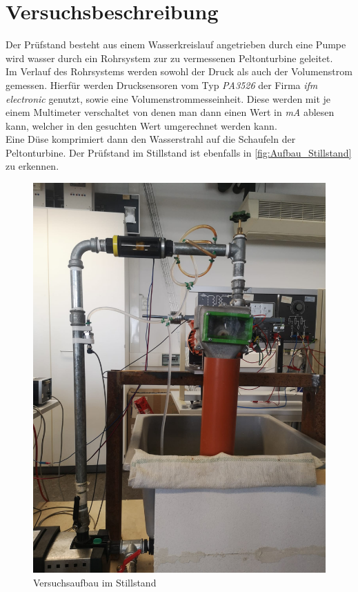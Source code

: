 \section{Versuchsbeschreibung}
\label{section:Versuchsbeschreibung}
%
Der Prüfstand besteht aus einem Wasserkreislauf angetrieben durch eine Pumpe wird wasser durch ein Rohrsystem zur zu vermessenen Peltonturbine geleitet.\\
Im Verlauf des Rohrsystems werden sowohl der Druck als auch der Volumenstrom gemessen.
Hierfür werden Drucksensoren vom Typ \textit{PA3526} der Firma \textit{ifm electronic} genutzt, sowie eine Volumenstrommesseinheit.
Diese werden mit je einem Multimeter verschaltet von denen man dann einen Wert in \textit{mA} ablesen kann, welcher in den gesuchten Wert umgerechnet werden kann.\\
Eine Düse komprimiert dann den Wasserstrahl auf die Schaufeln der Peltonturbine.
Der Prüfstand im Stillstand ist ebenfalls in \autoref{fig:Aufbau_Stillstand} zu erkennen.\\
%
\begin{figure}[!h]
    \centering
    \includegraphics[scale=0.125]{Abbildungen/Aufbau Pelton.jpeg}
    \caption{Versuchsaufbau im Stillstand}
    \label{fig:Aufbau_Stillstand}
\end{figure}

